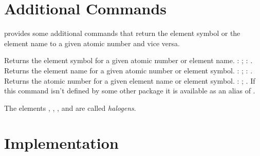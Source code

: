 \documentclass[toc=index]{cnpkgdoc}
\begin{document}
\begin{beispiel}
  
\end{beispiel}

\begin{beispiel}
  
\end{beispiel}

\begin{beispiel}
  
\end{beispiel}

\section{Additional Commands}\label{sec:additional}
\BOHR provides some additional commands that return the element symbol or the
element name to a given atomic number and vice versa.
\begin{beschreibung}
 \newline
   Returns the element symbol for a given atomic number or element name.
   : ; :
   .
 \newline
   Returns the element name for a given atomic number or element symbol.
   : ; : .
 \newline
   Returns the atomic number for a given element name or element symbol.
   : ; 
   .
 \newline
   If this command isn't defined by some other package it is available as an
   alias of .
\end{beschreibung}

\begin{beispiel}
 The elements , , ,
  and  are called \emph{halogens}.
\end{beispiel}

\section{Implementation}
\implementation

\printindex
\end{document}
